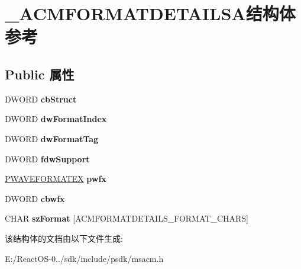 \hypertarget{struct___a_c_m_f_o_r_m_a_t_d_e_t_a_i_l_s_a}{}\section{\+\_\+\+A\+C\+M\+F\+O\+R\+M\+A\+T\+D\+E\+T\+A\+I\+L\+S\+A结构体 参考}
\label{struct___a_c_m_f_o_r_m_a_t_d_e_t_a_i_l_s_a}
\subsection*{Public 属性}
\begin{DoxyCompactItemize}
\item 
\mbox{\label{struct___a_c_m_f_o_r_m_a_t_d_e_t_a_i_l_s_a_ac116051a4948fd3611f36ffdd660c2ad}} 
D\+W\+O\+RD {\bfseries cb\+Struct}
\item 
\mbox{\label{struct___a_c_m_f_o_r_m_a_t_d_e_t_a_i_l_s_a_a1e0d263a00a3d9dc2fa77dac1ca507b6}} 
D\+W\+O\+RD {\bfseries dw\+Format\+Index}
\item 
\mbox{\label{struct___a_c_m_f_o_r_m_a_t_d_e_t_a_i_l_s_a_acdbb5e17c0cfb21881879f6821772ad3}} 
D\+W\+O\+RD {\bfseries dw\+Format\+Tag}
\item 
\mbox{\label{struct___a_c_m_f_o_r_m_a_t_d_e_t_a_i_l_s_a_af8537de31d226bfdea83a78cf01635c2}} 
D\+W\+O\+RD {\bfseries fdw\+Support}
\item 
\mbox{\label{struct___a_c_m_f_o_r_m_a_t_d_e_t_a_i_l_s_a_a617726ad31203c14d07ea4692597e414}} 
\hyperlink{struct___w_a_v_e_f_o_r_m_a_t_e_x}{P\+W\+A\+V\+E\+F\+O\+R\+M\+A\+T\+EX} {\bfseries pwfx}
\item 
\mbox{\label{struct___a_c_m_f_o_r_m_a_t_d_e_t_a_i_l_s_a_a72438dffd8718f5e3435050d25a77bb7}} 
D\+W\+O\+RD {\bfseries cbwfx}
\item 
\mbox{\label{struct___a_c_m_f_o_r_m_a_t_d_e_t_a_i_l_s_a_a0a549a3140ef3ca1a1ad8249c18233e3}} 
C\+H\+AR {\bfseries sz\+Format} \mbox{[}A\+C\+M\+F\+O\+R\+M\+A\+T\+D\+E\+T\+A\+I\+L\+S\+\_\+\+F\+O\+R\+M\+A\+T\+\_\+\+C\+H\+A\+RS\mbox{]}
\end{DoxyCompactItemize}


该结构体的文档由以下文件生成\+:\begin{DoxyCompactItemize}
\item 
E\+:/\+React\+O\+S-\/0../sdk/include/psdk/msacm.\+h\end{DoxyCompactItemize}
